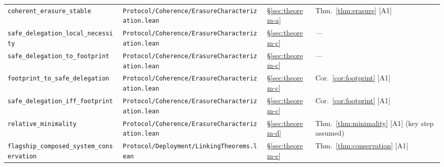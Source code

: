 \documentclass[a4paper,10pt,twocolumn,english]{article}
\numberwithin{equation}{section}
\theoremstyle{paperdef}
\theoremstyle{paperplain}
\theoremstyle{paperdef}
\theoremstyle{paperremark}
\theoremstyle{paperdef}
\begin{document}
\begin{table}[H]
\begin{tabularx}{\textwidth}{L{0.29\textwidth}L{0.37\textwidth}L{0.06\textwidth}>{\raggedright\arraybackslash}X}
		\texttt{coherent\_erasure\_\allowbreak stable}                                               & \texttt{Protocol/\allowbreak Coherence/\allowbreak}\mbox{\texttt{ErasureCharacterization.lean}}                                   & \S\ref{sec:theorem-a} & Thm.~\ref{thm:erasure} [A1]                                                                   \\
		\texttt{safe\_delegation\_\allowbreak local\_necessity}                                      & \texttt{Protocol/\allowbreak Coherence/\allowbreak}\mbox{\texttt{ErasureCharacterization.lean}}                                   & \S\ref{sec:theorem-c} & ---                                                                                           \\
		\texttt{safe\_delegation\_\allowbreak to\_footprint}                                         & \texttt{Protocol/\allowbreak Coherence/\allowbreak}\mbox{\texttt{ErasureCharacterization.lean}}                                   & \S\ref{sec:theorem-c} & ---                                                                                           \\
		\texttt{footprint\_to\_\allowbreak safe\_delegation}                                         & \texttt{Protocol/\allowbreak Coherence/\allowbreak}\mbox{\texttt{ErasureCharacterization.lean}}                                   & \S\ref{sec:theorem-c} & Cor.~\ref{cor:footprint} [A1]                                                                 \\
		\texttt{safe\_delegation\_\allowbreak iff\_footprint}                                        & \texttt{Protocol/\allowbreak Coherence/\allowbreak}\mbox{\texttt{ErasureCharacterization.lean}}                                   & \S\ref{sec:theorem-c} & Cor.~\ref{cor:footprint} [A1]                                                                 \\
		\texttt{relative\_minimality} & \texttt{Protocol/\allowbreak Coherence/\allowbreak}\mbox{\texttt{ErasureCharacterization.lean}} & \S\ref{sec:theorem-d} & Thm.~\ref{thm:minimality} [A1] (key step assumed) \\
		\texttt{flagship\_composed\_\allowbreak system\_conservation}                                & \texttt{Protocol/\allowbreak Deployment/\allowbreak}\mbox{\texttt{LinkingTheorems.lean}}                                          & \S\ref{sec:theorem-e} & Thm.~\ref{thm:conservation} [A1]                                                              \\

\end{tabularx}
\end{table}
\end{document}
